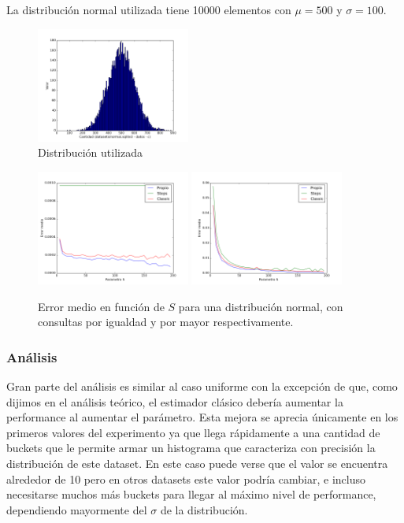 La distribución normal utilizada tiene 10000 elementos con $\mu=500$ y $\sigma=100$.


\begin{figure}[h!]  
  \centering
  \includegraphics[width=0.45\textwidth]{../source/datasets/img/normal}
  \caption{Distribución utilizada}
 \end{figure}

\begin{figure}[h!]
  \centering
  \includegraphics[width=0.45\textwidth]{../source/datasets/img/normalEqual}
  \includegraphics[width=0.45\textwidth]{../source/datasets/img/normalGreater}
  \caption{Error medio en función de $S$ para una distribución normal, con consultas por igualdad y por mayor respectivamente.}
 \end{figure}

 \subsubsection*{Análisis}
Gran parte del análisis es similar al caso uniforme con la excepción de que, como dijimos en el análisis teórico, el estimador clásico debería aumentar la performance al aumentar el parámetro. Esta mejora se aprecia únicamente en los primeros valores del experimento ya que llega rápidamente a una cantidad de buckets que le permite armar un histograma que caracteriza con precisión la distribución de este dataset. En este caso puede verse que el valor se encuentra alrededor de 10 pero en otros datasets este valor podría cambiar, e incluso necesitarse muchos más buckets para llegar al máximo nivel de performance, dependiendo mayormente del $\sigma$ de la distribución.

